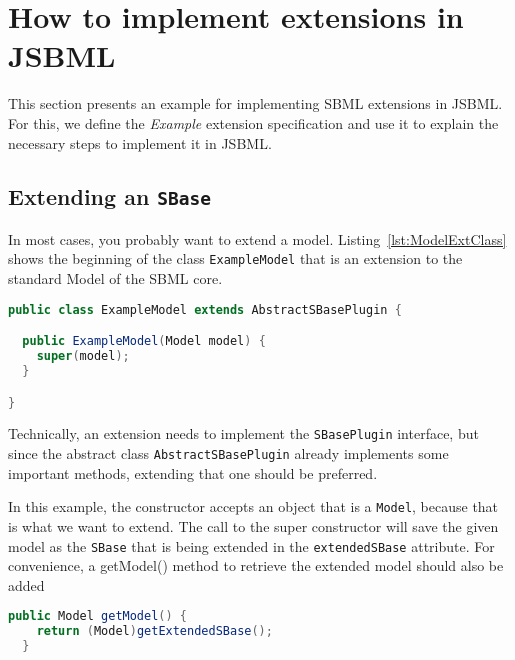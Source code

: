 \section{How to implement extensions in JSBML}
\label{sec:howToExtension}

This section presents an example for implementing SBML extensions in JSBML.
For this, we define the \emph{Example} extension specification and use it to explain the necessary steps to implement it in JSBML.

\subsection{Extending an \texttt{SBase}}
\label{subsec:extendingSBase}

In most cases, you probably want to extend a model.
Listing~\vref{lst:ModelExtClass} shows the beginning of the class \texttt{ExampleModel} that is an extension to the standard Model of the SBML core.
\begin{lstlisting}[language=Java,caption={Extending \texttt{AbstractSBasePlugin}},label={lst:ModelExtClass}]
public class ExampleModel extends AbstractSBasePlugin {

  public ExampleModel(Model model) {
    super(model);
  }

}
\end{lstlisting}
Technically, an extension needs to implement the \texttt{SBasePlugin} interface,
but since the abstract class \texttt{AbstractSBasePlugin} already implements some important methods, extending that one should be preferred.

In this example, the constructor accepts an object that is a \texttt{Model}, because that is what we want to extend.
The call to the super constructor will save the given model as the \texttt{SBase} that is being extended in the \texttt{extendedSBase} attribute.
For convenience, a getModel() method to retrieve the extended model should also be added
\begin{lstlisting}[language=Java,caption={Convenience method to retrieve the extended model},label={lst:ModelExtGetModel}]
  public Model getModel() {
    return (Model)getExtendedSBase();
  }
\end{lstlisting}


